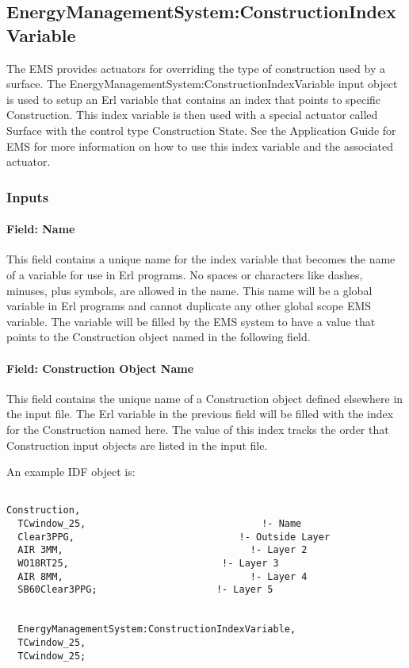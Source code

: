 \subsection{EnergyManagementSystem:ConstructionIndexVariable}\label{energymanagementsystemconstructionindexvariable}

The EMS provides actuators for overriding the type of construction used by a surface. The EnergyManagementSystem:ConstructionIndexVariable input object is used to setup an Erl variable that contains an index that points to specific Construction. This index variable is then used with a special actuator called Surface with the control type Construction State. See the Application Guide for EMS for more information on how to use this index variable and the associated actuator.

\subsubsection{Inputs}\label{inputs-10-004}

\paragraph{Field: Name}\label{field-name-10-004}

This field contains a unique name for the index variable that becomes the name of a variable for use in Erl programs. No spaces or characters like dashes, minuses, plus symbols, are allowed in the name. This name will be a global variable in Erl programs and cannot duplicate any other global scope EMS variable. The variable will be filled by the EMS system to have a value that points to the Construction object named in the following field.

\paragraph{Field: Construction Object Name}\label{field-construction-object-name}

This field contains the unique name of a Construction object defined elsewhere in the input file. The Erl variable in the previous field will be filled with the index for the Construction named here. The value of this index tracks the order that Construction input objects are listed in the input file.

An example IDF object is:

\begin{lstlisting}

Construction,
  TCwindow_25,                               !- Name
  Clear3PPG,                             !- Outside Layer
  AIR 3MM,                                 !- Layer 2
  WO18RT25,                           !- Layer 3
  AIR 8MM,                                 !- Layer 4
  SB60Clear3PPG;                     !- Layer 5


  EnergyManagementSystem:ConstructionIndexVariable,
  TCwindow_25,
  TCwindow_25;
\end{lstlisting}
